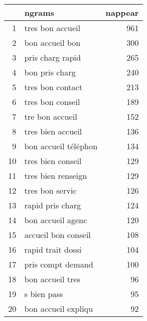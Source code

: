 \begin{tabular}{|r|l|r|}
  \hline
 & ngrams & nappear \\ 
  \hline
1 & tres bon accueil & 961 \\ 
  2 & bon accueil bon & 300 \\ 
  3 & pris charg rapid & 265 \\ 
  4 & bon pris charg & 240 \\ 
  5 & tres bon contact & 213 \\ 
  6 & tres bon conseil & 189 \\ 
  7 & tre bon accueil & 152 \\ 
  8 & tres bien accueil & 136 \\ 
  9 & bon accueil téléphon & 134 \\ 
  10 & tres bien conseil & 129 \\ 
  11 & tres bien renseign & 129 \\ 
  12 & tres bon servic & 126 \\ 
  13 & rapid pris charg & 124 \\ 
  14 & bon accueil agenc & 120 \\ 
  15 & accueil bon conseil & 108 \\ 
  16 & rapid trait dossi & 104 \\ 
  17 & pris compt demand & 100 \\ 
  18 & bon accueil tres &  96 \\ 
  19 & s bien pass &  95 \\ 
  20 & bon accueil expliqu &  92 \\ 
   \hline
\end{tabular}
